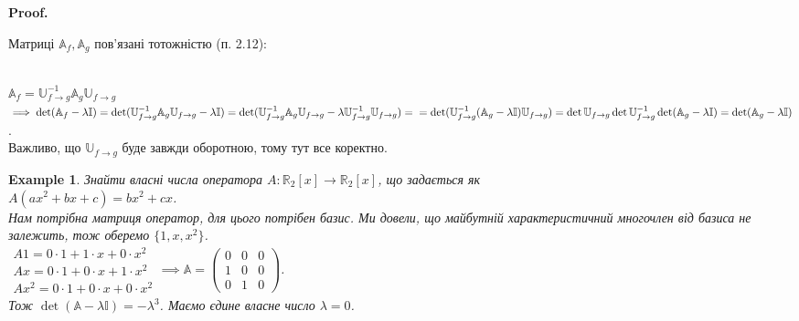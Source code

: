 \documentclass[a4paper, 10pt]{article}
\makeatletter
\theoremstyle{theoremdd}
\newtheorem{example}[theorem]{Example}
\renewenvironment{proof}[1][Proof.\\]{\par
\pushQED{\hfill \qed}%
\normalfont \topsep6\p@\@plus6\p@\relax
\trivlist
\item\relax
{\bfseries
#1\@addpunct{.}}\hspace\labelsep\ignorespaces
}{%
\popQED\endtrivlist\@endpefalse
}
\makeatother
\begin{document}
\begin{proof}
Матриці $\mathbb{A}_f, \mathbb{A}_g$ пов'язані тотожністю (п. 2.12):\\
\\
$\mathbb{A}_f = \mathbb{U}^{-1}_{f \to g} \mathbb{A}_g \mathbb{U}_{f \to g}$\\
$\implies \det(\mathbb{A}_f - \lambda \mathbb{I}) = \det(\mathbb{U}^{-1}_{f \to g} \mathbb{A}_g \mathbb{U}_{f \to g} - \lambda \mathbb{I}) = \det(\mathbb{U}^{-1}_{f \to g} \mathbb{A}_g \mathbb{U}_{f \to g} - \lambda \mathbb{U}^{-1}_{f \to g} \mathbb{U}_{f \to g}) = \\ = \det(\mathbb{U}^{-1}_{f \to g}(\mathbb{A}_g-\lambda \mathbb{I})\mathbb{U}_{f \to g}) = \det \mathbb{U}_{f \to g} \det \mathbb{U}_{f \to g}^{-1} \det (\mathbb{A}_g - \lambda \mathbb{I}) = \det (\mathbb{A}_g - \lambda \mathbb{I})$.\\
Важливо, що $\mathbb{U}_{f \to g}$ буде завжди оборотною, тому тут все коректно.
\end{proof}

\begin{example}
Знайти власні числа оператора $A \colon \mathbb{R}_2[x] \to \mathbb{R}_2[x]$, що задається як\\
$A(ax^2+bx+c) = bx^2 + cx$.\\
Нам потрібна матриця оператор, для цього потрібен базис. Ми довели, що майбутній характеристичний многочлен від базиса не залежить, тож оберемо $\{1,x,x^2\}$.\\
$\begin{gathered} A1 = 0 \cdot 1 + 1 \cdot x + 0 \cdot x^2 \\ Ax = 0 \cdot 1 + 0 \cdot x + 1 \cdot x^2 \\ Ax^2 = 0 \cdot 1 + 0 \cdot x + 0 \cdot x^2 \end{gathered} \implies \mathbb{A} = \begin{pmatrix}
0 & 0 & 0 \\
1 & 0 & 0 \\
0 & 1 & 0
\end{pmatrix}$.\\
Тож $\det (\mathbb{A}-\lambda \mathbb{I}) = -\lambda^3$. Маємо єдине власне число $\lambda = 0$.
\end{example}
\end{document}
